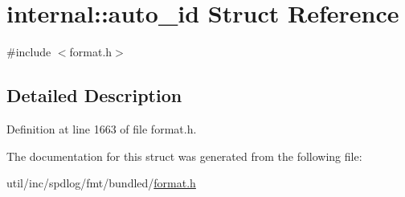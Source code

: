 \hypertarget{structinternal_1_1auto__id}{}\section{internal\+:\+:auto\+\_\+id Struct Reference}
\label{structinternal_1_1auto__id}


{\ttfamily \#include $<$format.\+h$>$}



\subsection{Detailed Description}


Definition at line 1663 of file format.\+h.



The documentation for this struct was generated from the following file\+:\begin{DoxyCompactItemize}
\item 
util/inc/spdlog/fmt/bundled/\hyperlink{format_8h}{format.\+h}\end{DoxyCompactItemize}
